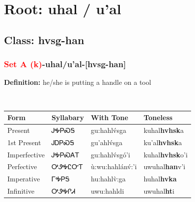 \needspace{4in}
\section*{Root: uhal / u'al}
\nopagebreak
{}
\needspace{3in}
\subsection*{Class: hvsg-han}
\nopagebreak
\needspace{2in}
\subsubsection*{\textcolor{Red}{Set A (k)}{-}\textbf{uhal/u'al}{-}[hvsg-han]}
\nopagebreak
\textbf{Definition: } he/she is putting a handle on a tool
\\[0.5em]
\begin{tabularx}{\textwidth}{l X X X}%
\toprule%
\textbf{Form}&\textbf{Syllabary}&\textbf{With Tone}&\textbf{Toneless}\\%
\midrule%
Present&ᎫᎭᏢᏍᎦ&gu:hahlv́sga&kuhal\textbf{hvhsk}a\\%
1st Present&ᎫᎠᏢᏍᎦ&gu’ahlv́sga&ku'al\textbf{hvhsk}a\\%
Imperfective&ᎫᎭᏢᏍᎪᎢ&gu:hahlv́sgó’i&kuhal\textbf{hvhsk}o'i\\%
Perfective&ᎤᏭᎭᏝᏅᎢ&ù:wu:hahlánv́:’i&uwuhal\textbf{han}v'i\\%
Imperative&ᎱᎭᏢᎦ&hu:hahlv̀:ga&huhal\textbf{hvka}\\%
Infinitive&ᎤᏭᎭᎵᏗ&uwu:hahldi&uwuhal\textbf{ht}i\\%
\bottomrule%
\end{tabularx}
\\[1em]